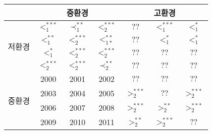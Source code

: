 \begin{tabular}{c|c|c|c|c|c|c}
\hline & \multicolumn{3}{|c|}{중환경} & \multicolumn{3}{c}{고환경} \\
\hline \multirow{4}{*}{저환경} & $<_{1}^{* * *}$ & $\prec_{1}^{* *}$ & $<_{2}^{* * *}$ & $? ?$ & $<_{1}^{* * *}$ & $<_{1}^{*}$ \\
\cline{2-7} &$<_{1}^{* *}$ & $<_{2}^{* * *}$ & $<_{1 *}^{* *}$ & $? ?$ & $<_{1}^{*}$ & $<_{1}^{*}$ \\
\cline{2-7} &$<_{1}^{*}$ & $<_{2}^{* * *}$ & $<_{2}^{* * *}$ & $? ?$ & $? ?$ & $? ?$ \\
\cline{2-7} &$<_{2}^{* * *}$ & $<_{2}^{* * *}$ & $\prec_{2}^{* *}$ & $? ?$ & $? ?$ & $? ?$ \\
\hline \multirow{4}{*}{중환경} & 2000 & 2001 & 2002 & $? ?$ & $? ?$ & $? ?$ \\
\cline{2-7} & 2003 & 2004 & 2005 & $>_{2}^{* * *}$ & $? ?$ & $>_{2}^{* * *}$ \\
\cline{2-7} & 2006 & 2007 & 2008 & $>_{2}^{* * *}$ & $>_{2}^{* *}$ & $>_{2}^{* * *}$ \\
\cline{2-7} & 2009 & 2010 & 2011 & $>_{2}^{* *}$ & $>_{2}^{* * *}$ & $? ?$\\
\hline
\end{tabular}